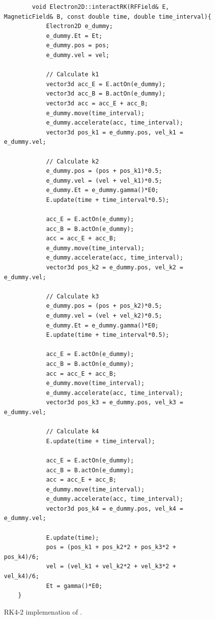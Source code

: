 \documentclass[a4paper,oneside,12pt]{report}
\numberwithin{equation}{chapter}
\begin{document}
\begin{figure}[H]
    \centering
    \begin{verbatim}
        void Electron2D::interactRK(RFField& E, MagneticField& B, const double time, double time_interval){
            Electron2D e_dummy;
            e_dummy.Et = Et;
            e_dummy.pos = pos;
            e_dummy.vel = vel;
    
            // Calculate k1
            vector3d acc_E = E.actOn(e_dummy);
            vector3d acc_B = B.actOn(e_dummy);
            vector3d acc = acc_E + acc_B;
            e_dummy.move(time_interval);
            e_dummy.accelerate(acc, time_interval);
            vector3d pos_k1 = e_dummy.pos, vel_k1 = e_dummy.vel;
    
            // Calculate k2
            e_dummy.pos = (pos + pos_k1)*0.5;
            e_dummy.vel = (vel + vel_k1)*0.5;
            e_dummy.Et = e_dummy.gamma()*E0;
            E.update(time + time_interval*0.5);
    
            acc_E = E.actOn(e_dummy);
            acc_B = B.actOn(e_dummy);
            acc = acc_E + acc_B;
            e_dummy.move(time_interval);
            e_dummy.accelerate(acc, time_interval);
            vector3d pos_k2 = e_dummy.pos, vel_k2 = e_dummy.vel;
    
            // Calculate k3
            e_dummy.pos = (pos + pos_k2)*0.5;
            e_dummy.vel = (vel + vel_k2)*0.5;
            e_dummy.Et = e_dummy.gamma()*E0;
            E.update(time + time_interval*0.5);

            acc_E = E.actOn(e_dummy);
            acc_B = B.actOn(e_dummy);
            acc = acc_E + acc_B;
            e_dummy.move(time_interval);
            e_dummy.accelerate(acc, time_interval);
            vector3d pos_k3 = e_dummy.pos, vel_k3 = e_dummy.vel;
    
            // Calculate k4
            E.update(time + time_interval);

            acc_E = E.actOn(e_dummy);
            acc_B = B.actOn(e_dummy);
            acc = acc_E + acc_B;
            e_dummy.move(time_interval);
            e_dummy.accelerate(acc, time_interval);
            vector3d pos_k4 = e_dummy.pos, vel_k4 = e_dummy.vel;
    
            E.update(time);
            pos = (pos_k1 + pos_k2*2 + pos_k3*2 + pos_k4)/6;
            vel = (vel_k1 + vel_k2*2 + vel_k3*2 + vel_k4)/6;
            Et = gamma()*E0;
    }
    \end{verbatim}
    \vspace{20pt}
\caption{RK4-2 implemenation of \eEM.}
\label{fig:rk2_EM}
\end{figure}
\end{document}

